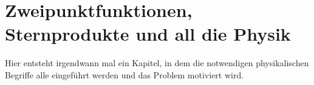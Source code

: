 
\section{Zweipunktfunktionen, Sternprodukte und all die Physik} %
\label{sec:zweipunktfunktionen_sternprodukte_und_all_die_physik}


Hier entsteht irgendwann mal ein Kapitel, in dem die notwendigen physikalischen Begriffe alle eingeführt werden und das Problem motiviert wird.
